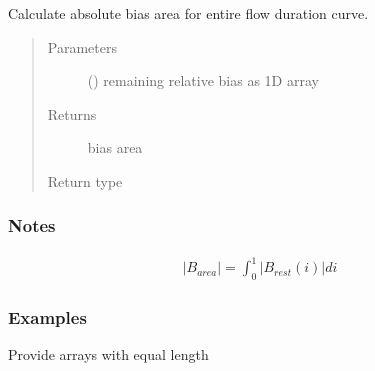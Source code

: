 \documentclass[letterpaper,10pt,english]{sphinxmanual}
\begin{document}
\begin{fulllineitems}
\label{\detokenize{reference/de:de.de.calc_bias_area}}
Calculate absolute bias area for entire flow duration curve.
\begin{quote}\begin{description}
\item[{Parameters}] \leavevmode
{} (\sphinxstyleliteralemphasis{\sphinxupquote{(}}\sphinxstyleliteralemphasis{\sphinxupquote{,}}\sphinxstyleliteralemphasis{\sphinxupquote{)}}) \textendash{} remaining relative bias as 1\sphinxhyphen{}D array

\item[{Returns}] \leavevmode
{} \textendash{} bias area

\item[{Return type}] \leavevmode
{}

\end{description}\end{quote}
\subsubsection*{Notes}
\begin{equation*}
\begin{split}\vert B_{area}\vert = \int_{0}^{1}\vert B_{rest}(i)\vert di\end{split}
\end{equation*}\subsubsection*{Examples}

Provide arrays with equal length


\end{fulllineitems}
\end{document}
